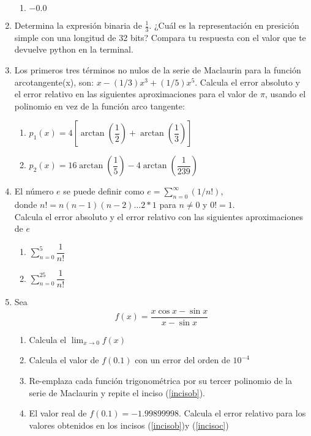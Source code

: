 \documentclass[11pt]{article}
\begin{document}
\begin{enumerate}
\begin{enumerate}
\item $-0.0$
\end{enumerate}
\item Determina la expresión binaria de $\frac{1}{3}$. ¿Cu\'{a}l es la representación en presición simple con una longitud de 32 bits? Compara tu respuesta con el valor que te devuelve python en la terminal.
\item Los primeros tres términos no nulos de la serie de Maclaurin para la función arcotangente(x), son: $x-(1/3)x^{3} +(1/5)x^{5}$. Calcula el error absoluto y el error relativo en las siguientes aproximaciones para el valor de $\pi$, usando el polinomio en vez de la función arco tangente:
\begin{enumerate}
\item $p_{1}(x)= 4 \left[ \arctan \left( \dfrac{1}{2} \right) + \arctan \left( \dfrac{1}{3} \right) \right]$
\item $p_{2}(x) = 16 \arctan \left( \dfrac{1}{5} \right) - 4 \arctan \left( \dfrac{1}{239} \right)$
\end{enumerate}
\item El número $e$ se puede definir como $e = \sum_{n=0}^{\infty} (1/n!)$,\\
donde $n! = n(n-1)(n-2)\ldots2*1$ para $n \neq 0$ y $0! = 1$.\\
Calcula el error absoluto y el error relativo con las siguientes aproximaciones de $e$
\begin{enumerate}
\item $ \sum_{n=0}^{5} \dfrac{1}{n!} $
\item $ \sum_{n=0}^{25} \dfrac{1}{n!} $
\end{enumerate}
\item Sea
\[ f(x) = \dfrac{x \cos x - \sin x}{x - \sin x}\]
\begin{enumerate}
\item Calcula el $\displaystyle\lim_{x \rightarrow 0} f(x)$
\item Calcula el valor de $f(0.1)$ con un error del orden de $10^{-4}$ \label{incisob}
\item Re-emplaza cada función trigonométrica por su tercer polinomio de la serie de Maclaurin y repite el inciso (\ref{incisob}). \label{incisoc}
\item El valor real de $f(0.1) = -1.99899998$. Calcula el error relativo para los valores obtenidos en los incisos (\ref{incisob})y (\ref{incisoc}) 
\end{enumerate}
\end{enumerate}
\end{document}
